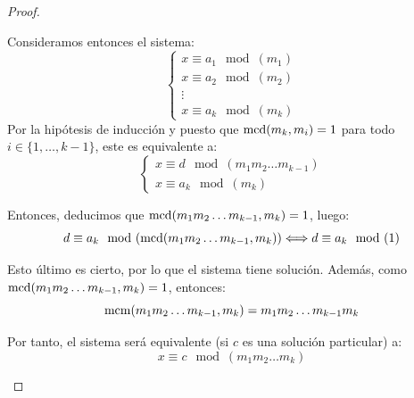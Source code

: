 \begin{lema}
\begin{proof}
\begin{itemize}
    Consideramos entonces el sistema:
    $$\left\{ \begin{array}{l}
            x\equiv a_1\mod(m_1) \\
            x\equiv a_2\mod(m_2) \\
            \vdots               \\
            x\equiv a_k\mod(m_k)
        \end{array} \right.$$
    Por la hipótesis de inducción y puesto que $\operatorname{mcd}(m_k, m_i) = 1$ para todo $i \in \{1, \ldots, k-1\}$, este es equivalente a:
    $$\left\{ \begin{array}{l}
            x\equiv d\mod(m_1m_2\ldots m_{k-1}) \\
            x\equiv a_k\mod(m_k)
        \end{array} \right.$$
        
    Entonces, deducimos que $\operatorname{mcd}(m_1m_2\ldots m_{k-1},m_k)=1$, luego:
    $$d\equiv a_k\mod(\operatorname{mcd}(m_1m_2\ldots m_{k-1},m_k)) \Longleftrightarrow d\equiv a_k\mod(1)$$

    Esto último es cierto, por lo que el sistema tiene solución.
    Además, como $\operatorname{mcd}(m_1m_2\ldots m_{k-1},m_k) = 1$, entonces:
    $$\operatorname{mcm}(m_1m_2\ldots m_{k-1},m_k)=m_1m_2\ldots m_{k-1}m_k$$

    Por tanto, el sistema será equivalente (si $c$ es una solución particular) a:
    $$x\equiv c\mod(m_1m_2\ldots m_k)$$
    \end{itemize}
\end{proof}
\end{lema}

